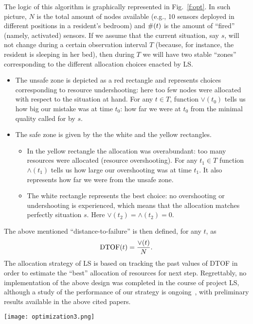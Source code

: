 \documentclass[twocolumn]{svjour3}
\begin{document}
The logic of this algorithm is graphically represented in Fig.~\ref{f:opt}. In such picture,
$N$ is the total amount of nodes
available (e.g., 10 sensors deployed in different positions in a resident's bedroom)
and $\hbox{\#}(t)$ is the amount of
``fired'' (namely, activated) sensors. If we assume that the current
situation, say $s$, will not change during a certain observation interval $T$ (because, for instance, the resident is
sleeping in her bed), then during $T$ we will have two stable ``zones'' corresponding to the different
allocation choices enacted by LS.
\begin{itemize}
	\item The unsafe zone is depicted as a red rectangle and represents choices corresponding
		to resource undershooting:
		here too few nodes were allocated with respect to the situation at hand.
		For any $t\in T$,
		function $\vee(t_0)$ tells us how big our mistake was at time $t_0$: how far we were at $t_0$ 
		from the minimal quality called for by $s$.
	\item The safe zone is given by the the white and the yellow rectangles.
		\begin{itemize}
		\item In the yellow rectangle
		the allocation was overabundant: too many resources were allocated (resource overshooting).
		For any $t_1\in T$ function $\wedge(t_1)$ tells us how large our overshooting was at time $t_1$.
		It also represents how far we were from the unsafe zone.
		\item The white rectangle represents the best choice: no overshooting or undershooting
			is experienced, which means that
			the allocation matches perfectly situation $s$.
			Here $\vee(t_2)=\wedge(t_2)=0$.
	\end{itemize}
\end{itemize}

The above mentioned ``distance-to-failure'' is then defined, for any $t$, as 
\begin{equation}
 \hbox{DTOF}(t) = \frac{\vee(t)}{N}.
\end{equation}
The allocation strategy of LS is based on tracking the past values of DTOF in order to estimate the ``best''
allocation of resources for next step. Regrettably, no implementation of the above design was completed
in the course of project LS, although a study of the performance of our strategy
is ongoing~\cite{Buys15}, with preliminary results available in the above cited papers.


\begin{figure*}
\centerline{\texttt{[image: optimization3.png]}}
\caption{LS optimization is based on measuring resource overshooting (function $\wedge$) and
undershooting (function $\vee$) and adjusting resource allocation accordingly. The picture
shows the three possible system states: in $t_0$ the system experiences resource undershooting; 
in $t_1$, resource overshooting; and in $t_2$ it reaches an optimal resource expenditure.}
\label{f:opt}
\end{figure*}
\end{document}
